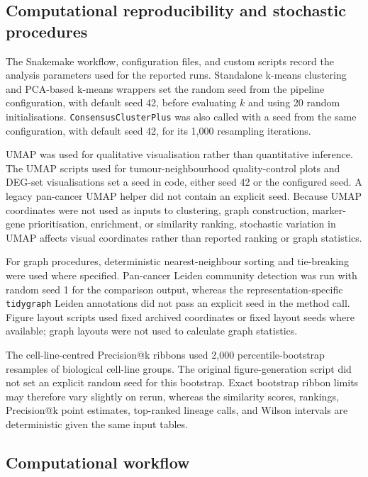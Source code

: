 \subsection{Computational reproducibility and stochastic procedures}

The Snakemake workflow, configuration files, and custom scripts record the
analysis parameters used for the reported runs. Standalone k-means clustering
and PCA-based k-means wrappers set the random seed from the pipeline
configuration, with default seed 42, before evaluating \(k\) and using 20 random
initialisations. \texttt{ConsensusClusterPlus} was also called with a seed from
the same configuration, with default seed 42, for its 1{,}000 resampling
iterations.

UMAP was used for qualitative visualisation rather than quantitative inference.
The UMAP scripts used for tumour-neighbourhood quality-control plots and
DEG-set visualisations set a seed in code, either seed 42 or the configured seed.
A legacy pan-cancer UMAP helper did not contain an explicit seed. Because UMAP
coordinates were not used as inputs to clustering, graph construction,
marker-gene prioritisation, enrichment, or similarity ranking, stochastic
variation in UMAP affects visual coordinates rather than reported ranking or
graph statistics.

For graph procedures, deterministic nearest-neighbour sorting and tie-breaking
were used where specified. Pan-cancer Leiden community detection was run with
random seed 1 for the comparison output, whereas the representation-specific
\texttt{tidygraph} Leiden annotations did not pass an explicit seed in the
method call. Figure layout scripts used fixed archived coordinates or fixed
layout seeds where available; graph layouts were not used to calculate graph
statistics.

The cell-line-centred Precision@k ribbons used 2{,}000 percentile-bootstrap
resamples of biological cell-line groups. The original figure-generation script
did not set an explicit random seed for this bootstrap. Exact bootstrap ribbon
limits may therefore vary slightly on rerun, whereas the similarity scores,
rankings, Precision@k point estimates, top-ranked lineage calls, and Wilson
intervals are deterministic given the same input tables.

\subsection{Computational workflow}

